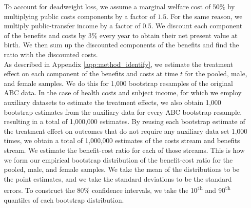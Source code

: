 \noindent To account for deadweight loss, we assume a marginal welfare cost of 50\% by multiplying
public costs components by a factor of $1.5$. For the same reason, we multiply public-transfer
income by a factor of 0.5. We discount each component of the benefits and costs
by 3\% every year to obtain their net present value at birth. We then sum up the discounted
components of the benefits and find the ratio with the discounted costs. \\

\noindent As described in Appendix \ref{app:method_identify}, we estimate the treatment effect on each
component of the benefits and costs at time $t$ for the pooled, male, and
female samples. We do this for 1,000 bootstrap resamples of the original ABC data.
In the case of health costs and subject income, for which we employ auxiliary datasets to
estimate the treatment effects, we also obtain 1,000 bootstrap estimates from the auxiliary data
for every ABC bootstrap resample, resulting in a total of 1,000,000 estimates.
By reusing each bootstrap estimate of the treatment effect on outcomes that do not require any auxiliary data
set 1,000 times, we obtain a total of 1,000,000 estimates of the costs stream and benefits stream.
We estimate the benefit-cost ratio for each of those streams.
This is how we form our empirical bootstrap distribution of the benefit-cost ratio for the pooled, male, and female samples.
We take the mean of the distributions to be the point estimates, and we take the standard deviations
to be the standard errors. To construct the 80\% confidence intervals, we take the 10\textsuperscript{th}
and 90\textsuperscript{th} quantiles of each bootstrap distribution.




